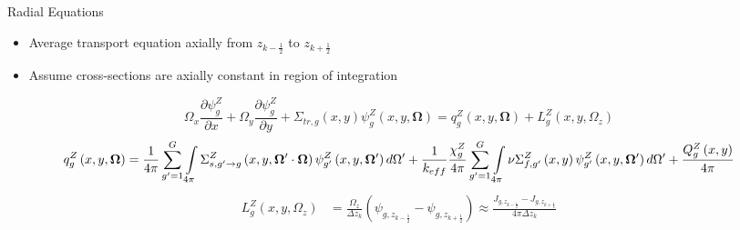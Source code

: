 
\begin{frame}[t]{Radial Equations}
    
    \begin{itemize}
      \item Average transport equation axially from $z_{k-\frac{1}{2}}$ to 
      $z_{k+\frac{1}{2}}$
      \item Assume cross-sections are axially constant in region of integration
    \end{itemize}
    \begin{dmath*}
        {\Omega_x\frac{\partial \psi_{g}^Z}{\partial x} + 
        \Omega_y\frac{\partial \psi_{g}^Z}{\partial y}} + 
        {\Sigma_{tr,g}\left(x,y\right)\psi_{g}^Z\left(x,y,\bm\Omega\right)} = 
        {q_{g}^Z\left(x,y,\bm \Omega\right)} + 
        {L_{g}^Z\left(x,y,\Omega_z\right)}
    \end{dmath*}
    \begin{dmath*}
        {q_{g}^Z\left(x,y,\bm \Omega\right)} = 
        {\frac{1}{4\pi}\sum_{g'=1}^{G}\intop_{4\pi}\Sigma_{s,g'\rightarrow 
        g}^Z\left(x,y,\bm\Omega'\cdot\bm\Omega\right)\psi_{g'}^Z\left(x,y,\bm\Omega'\right)d\Omega'}
         + {\frac{1}{k_{eff}}\frac{\chi_{g}^Z}{4\pi}\sum_{g'=1}^G\intop_{4\pi} 
        \nu\Sigma_{f,g'}^Z\left(x,y\right)\psi_{g'}^Z\left(x,y,\bm\Omega'\right)d\Omega'}
         + {\frac{Q_{g}^Z\left(x,y\right)}{4\pi}}
    \end{dmath*}
    \begin{align*}
    L_{g}^Z\left(x,y,\Omega_z\right) &= \frac{\Omega_z}{\Delta z_k}\left(\psi_{g,z_{k-\frac{1}{2}}} - \psi_{g,z_{k+\frac{1}{2}}}\right) \approx \frac{J_{g,z_{k-\frac{1}{2}}} - J_{g,z_{k+\frac{1}{2}}}}{4\pi\Delta z_k}
    \end{align*}
    
\end{frame}


